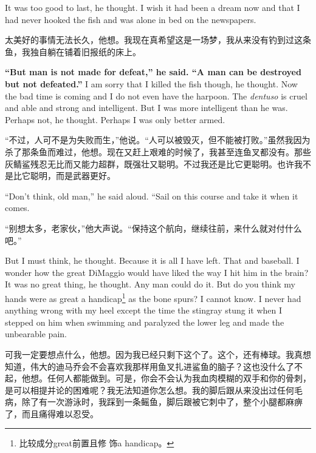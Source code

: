\begin{paracol}{2}
It was too good to last, he thought. I wish it had been a dream now and
that I had never hooked the fish and was alone in bed on the newspapers.

\switchcolumn

太美好的事情无法长久，他想。我现在真希望这是一场梦，我从来没有钓到过这条鱼，我独自躺在铺着旧报纸的床上。

\switchcolumn*

\textbf{``But man is not made for defeat,'' he said. ``A man can be
  destroyed but not defeated.''} I am sorry that I killed the fish though,
he thought. Now the bad time is coming and I do not even have the harpoon.
The \emph{dentuso} is cruel and able and strong and intelligent. But I was
more intelligent than he was. Perhaps not, he thought. Perhaps I was only
better armed.

\switchcolumn

“不过，人可不是为失败而生，”他说。“人可以被毁灭，但不能被打败。”虽然我因为杀了那条鱼而难过，他想。现在又赶上艰难的时候了，我甚至连鱼叉都没有。那些灰鲭鲨残忍无比而又能力超群，既强壮又聪明。不过我还是比它更聪明。也许我不是比它聪明，而是武器更好。

\switchcolumn*

``Don't think, old man,'' he said aloud. ``Sail on this course and take it
when it comes.

\switchcolumn

“别想太多，老家伙，”他大声说。“保持这个航向，继续往前，来什么就对付什么吧。”

\switchcolumn*

But I must think, he thought. Because it is all I have left. That and
baseball. I wonder how the great DiMaggio would have liked the way I hit him
in the brain? It was no great thing, he thought. Any man could do it. But do
you think my hands were as great a handicap\footnote{比较成分great前置且修
  饰a handicap。} as the bone spurs? I cannot know. I never had anything
wrong with my heel except the time the \gls{stingray} \gls{stung} it when I
stepped on him when swimming and \gls{paralyzed} the lower leg and made the
\gls{unbearable} pain.

\switchcolumn

可我一定要想点什么，他想。因为我已经只剩下这个了。这个，还有棒球。我真想知道，伟大的迪马乔会不会喜欢我那样用鱼叉扎进鲨鱼的脑子？这也没什么了不起，他想。任何人都能做到。可是，你会不会认为我血肉模糊的双手和你的骨刺，是可以相提并论的困难呢？我无法知道你怎么想。我的脚后跟从来没出过任何毛病，除了有一次游泳时，我踩到一条鳐鱼，脚后跟被它刺中了，整个小腿都麻痹了，而且痛得难以忍受。


\end{paracol}
